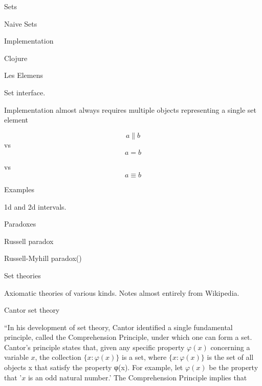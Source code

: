 \begin{plSection}{Sets}
\begin{plSection}{Naive Sets}
\begin{plSection}{Implementation}
\begin{plSection}{Clojure}
\end{plSection}%
\begin{plSection}{Les Elemens}

Set interface.

Implementation almost always requires multiple objects
representing a single set element

\begin{equation}
a \parallel b
\end{equation}
vs
\begin{equation}
a = b
\end{equation}

vs
\begin{equation}
a \equiv b
\end{equation}

\end{plSection}%
\end{plSection}%
\begin{plSection}{Examples}
 
1d and 2d intervals.
 
\end{plSection}%
\end{plSection}%
\begin{plSection}{Paradoxes}
\label{sec:Paradoxes}

Russell paradox~\cite{iep:RussellParadox}

Russell-Myhill paradox(\cite{iep:RussellMyhillParadox})
\end{plSection}%
\begin{plSection}{Set theories}


Axiomatic theories of various kinds.
Notes almost entirely from 
Wikipedia\cite{wiki:Set_theory,iep:SetTheory,eom:SetTheory,sep:SetTheory}.

\begin{plSection}{Cantor set theory}
\label{sec:Cantor_set_theory}

``In his development of set theory, 
Cantor identified a single fundamental principle, 
called the Comprehension Principle, 
under which one can form a set.
Cantor’s principle states that, 
given any specific property $\varphi(x)$ 
concerning a variable $x$, 
the collection $\{x:\varphi(x)\}$ is a set, 
where $\{x:\varphi(x)\}$ is 
the set of all objects x that satisfy the property φ(x).
For example, let $\varphi(x)$ be the property that 
'$x$ is an odd natural number.' 
The Comprehension Principle implies that


\end{plSection}
\end{plSection}
\end{plSection}
